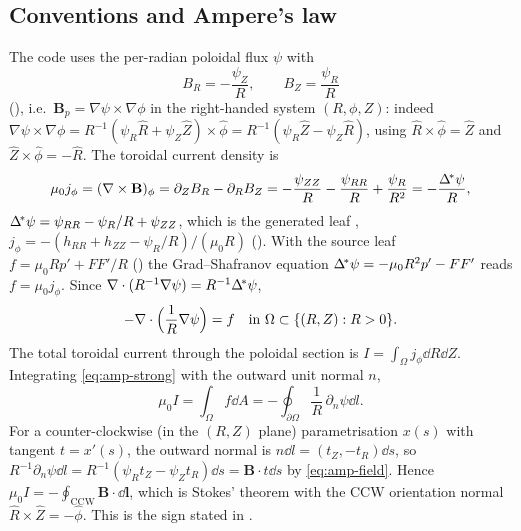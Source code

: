 \subsection{Conventions and Ampere's law}
The code uses the per-radian poloidal flux $\psi$ with
\begin{equation}
B_R=-\frac{\psi_Z}{R},\qquad B_Z=\frac{\psi_R}{R}
\label{eq:amp-field}
\end{equation}
(), i.e.\ $\mathbf B_p=\nabla\psi\times\nabla\phi$
in the right-handed system $(R,\phi,Z)$: indeed $\nabla\psi\times\nabla\phi
=R^{-1}(\psi_R\hat R+\psi_Z\hat Z)\times\hat\phi=R^{-1}(\psi_R\hat Z-\psi_Z\hat R)$,
using $\hat R\times\hat\phi=\hat Z$ and $\hat Z\times\hat\phi=-\hat R$.
The toroidal current density is
\begin{equation}
\mu_0 j_\phi=(\nabla\times\mathbf B)_\phi=\partial_Z B_R-\partial_R B_Z
=-\frac{\psi_{ZZ}}{R}-\frac{\psi_{RR}}{R}+\frac{\psi_R}{R^2}
=-\frac{\Delta^{\!*}\psi}{R},
\label{eq:amp-jphi}
\end{equation}
$\Delta^{\!*}\psi=\psi_{RR}-\psi_R/R+\psi_{ZZ}$, which is the generated leaf
, $j_\phi=-(h_{RR}+h_{ZZ}-\psi_R/R)/(\mu_0R)$
(). With the source leaf
$f=\mu_0Rp'+FF'/R$ () the
Grad--Shafranov equation $\Delta^{\!*}\psi=-\mu_0R^2p'-FF'$ reads $f=\mu_0 j_\phi$.
Since $\nabla\cdot(R^{-1}\nabla\psi)=R^{-1}\Delta^{\!*}\psi$,
\begin{equation}
-\nabla\cdot\Bigl(\frac{1}{R}\nabla\psi\Bigr)=f\quad\text{in }\Omega\subset\{(R,Z):R>0\}.
\label{eq:amp-strong}
\end{equation}
The total toroidal current through the poloidal section is
$I=\int_\Omega j_\phi\dd R\dd Z$. Integrating \eqref{eq:amp-strong} with the
outward unit normal $n$,
\begin{equation}
\mu_0 I=\int_\Omega f\dd A=-\oint_{\partial\Omega}\frac{1}{R}\,\partial_n\psi\dd l .
\label{eq:amp-gauss}
\end{equation}
For a counter-clockwise (in the $(R,Z)$ plane) parametrisation $x(s)$ with
tangent $t=x'(s)$, the outward normal is $n\dd l=(t_Z,-t_R)\dd s$, so
$R^{-1}\partial_n\psi\dd l=R^{-1}(\psi_Rt_Z-\psi_Zt_R)\dd s=\mathbf B\cdot t\dd s$
by \eqref{eq:amp-field}. Hence $\mu_0I=-\oint_{\mathrm{CCW}}\mathbf B\cdot\dd\mathbf l$,
which is Stokes' theorem with the CCW orientation normal $\hat R\times\hat Z=-\hat\phi$.
This is the sign stated in .

